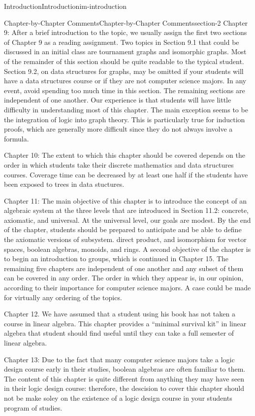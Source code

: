 \documentclass[oneside,10pt,]{book}
\begin{document}
\begin{chapterptx}{Introduction}{}{Introduction}{}{}{im-introduction}
\begin{sectionptx}{Chapter-by-Chapter Comments}{}{Chapter-by-Chapter Comments}{}{}{section-2}
Chapter 9: After a brief introduction to the topic, we usually assign the first two sections of Chapter 9 as a reading assignment. Two topics in Section 9.1 that could be discussed in an initial class are tournament graphs and isomorphic graphs. Most of the remainder of this section should be quite readable to the typical student. Section 9.2, on data structures for graphs, may be omitted if your students will have a data structures course or if they are not computer science majors. In any event, avoid spending too much time in this section. The remaining sections are independent of one another. Our experience is that students will have little difficulty in understanding most of this chapter. The main exception seems to be the integration of logic into graph theory. This is particularly true for induction proofs,  which are generally more difficult since they do not always involve a formula.%
\par
\hypertarget{p-18}{}%
Chapter 10: The extent to which this chapter should be covered depends on the order in which students take their discrete mathematics and data structures courses. Coverage time can be decreased by at least one half if the students have been exposed to trees in data stuctures.%
\par
\hypertarget{p-19}{}%
Chapter 11: The main objective of this chapter is to introduce the concept of an algebraic system at the three levels that are introduced in Section 11.2: concrete, axiomatic, and universal. At the universal level, our goals are modest. By the end of the chapter, students should be prepared to anticipate and be able to define the axiomatic versions of subsystem. direct product, and isomorphism for vector spaces, boolean algebras, monoids, and rings. A second objective of the chapter is to begin an introduction to groups, which is continued in Chapter 15.  The remaining five chapters are independent of one another and any subset of them can be covered in any order. The order in which they appear is, in our opinion, according to their importance for computer science majors. A case could be made for virtually any ordering of the topics.%
\par
\hypertarget{p-20}{}%
Chapter 12. We have assumed that a student using his book has not taken a course in linear algebra. This chapter provides a ``minimal survival kit'' in linear algebra that student should find useful until they can take a full semester of linear algebra.%
\par
\hypertarget{p-21}{}%
Chapter 13: Due to the fact that many computer science majors take a logic design course early in their studies, boolean algebras are often familiar to them. The content of this chapter is quite different from anything they may have seen in their logic design course: therefore, the descision to cover this chapter should not be make soley on the existence of a logic design course in your students program of studies.%

\end{sectionptx}
\end{chapterptx}
\end{document}
